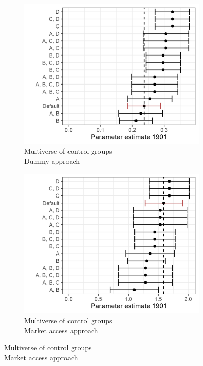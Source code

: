 \begin{figure}[H]
    \centering
    \caption{Multiverse of the effect in different comparison groups and parameter choices, 1787}
    \begin{subfigure}[b]{0.45\textwidth}
        \centering
        \caption{\label{fig:mult1} Multiverse of control groups\\Dummy approach}
        \includegraphics[width=\textwidth]{Plots/Regression_plots/Multiverse_dummy.png}
    \end{subfigure}
    \hfill
    \begin{subfigure}[b]{0.45\textwidth}
        \centering
        \caption{\label{fig:mult2} Multiverse of control groups\\Market access approach}
        \includegraphics[width=\textwidth]{Plots/Regression_plots/Multiverse_MA.png}

\end{subfigure}
\end{figure}
